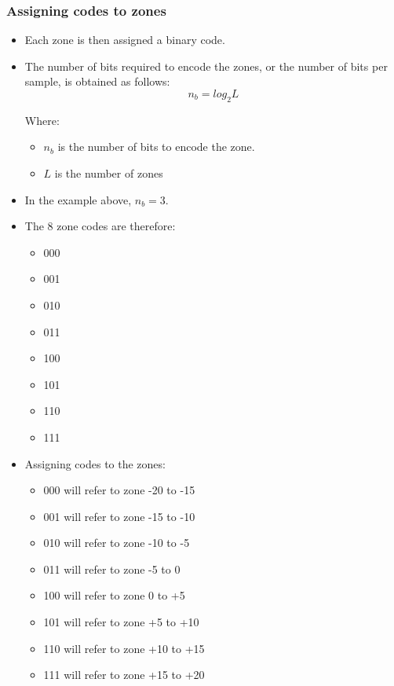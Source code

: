 \documentclass[11pt]{article}
\begin{document}
\subsubsection{Assigning codes to zones}
\label{sec:orgc8d788d}
\begin{itemize}
\item Each zone is then assigned a binary code.
\item The number of bits required to encode the zones, or the number of bits per sample, is obtained as follows:
\[n_b = log_2 L\]

Where:
\begin{itemize}
\item \(n_b\) is the number of bits to encode the zone.
\item \(L\) is the number of zones
\end{itemize}
\item In the example above, \(n_b = 3\).
\item The 8 zone codes are therefore:
\begin{itemize}
\item 000
\item 001
\item 010
\item 011
\item 100
\item 101
\item 110
\item 111
\end{itemize}
\item Assigning codes to the zones:
\begin{itemize}
\item 000 will refer to zone -20 to -15
\item 001 will refer to zone -15 to -10
\item 010 will refer to zone -10 to -5
\item 011 will refer to zone -5 to 0
\item 100 will refer to zone 0 to +5
\item 101 will refer to zone +5 to +10
\item 110 will refer to zone +10 to +15
\item 111 will refer to zone +15 to +20
\end{itemize}
\end{itemize}
\end{document}
